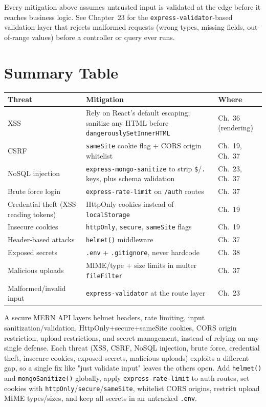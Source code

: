 Every mitigation above assumes untrusted input is validated at the edge
before it reaches business logic. See Chapter~23 for the
\texttt{express-validator}-based validation layer that rejects malformed
requests (wrong types, missing fields, out-of-range values) before a
controller or query ever runs.

\section{Summary Table}

\begin{center}
\begin{tabularx}{\textwidth}{p{2.6cm}Xp{2.6cm}}
\toprule
\textbf{Threat} & \textbf{Mitigation} & \textbf{Where} \\
\midrule
XSS & Rely on React's default escaping; sanitize any HTML before \texttt{dangerouslySetInnerHTML} & Ch.~36 (rendering) \\
CSRF & \texttt{sameSite} cookie flag + CORS origin whitelist & Ch.~19, Ch.~37 \\
NoSQL injection & \texttt{express-mongo-sanitize} to strip \texttt{\$}/\texttt{.} keys, plus schema validation & Ch.~23, Ch.~37 \\
Brute force login & \texttt{express-rate-limit} on \texttt{/auth} routes & Ch.~37 \\
Credential theft (XSS reading tokens) & HttpOnly cookies instead of \texttt{localStorage} & Ch.~19 \\
Insecure cookies & \texttt{httpOnly}, \texttt{secure}, \texttt{sameSite} flags & Ch.~19 \\
Header-based attacks & \texttt{helmet()} middleware & Ch.~37 \\
Exposed secrets & \texttt{.env} + \texttt{.gitignore}, never hardcode & Ch.~38 \\
Malicious uploads & MIME/type + size limits in multer \texttt{fileFilter} & Ch.~37 \\
Malformed/invalid input & \texttt{express-validator} at the route layer & Ch.~23 \\
\bottomrule
\end{tabularx}
\end{center}

\whatwhyhow
{A secure MERN API layers helmet headers, rate limiting, input sanitization/validation, HttpOnly+secure+sameSite cookies, CORS origin restriction, upload restrictions, and secret management, instead of relying on any single defense.}
{Each threat (XSS, CSRF, NoSQL injection, brute force, credential theft, insecure cookies, exposed secrets, malicious uploads) exploits a different gap, so a single fix like "just validate input" leaves the others open.}
{Add \texttt{helmet()} and \texttt{mongoSanitize()} globally, apply \texttt{express-rate-limit} to auth routes, set cookies with \texttt{httpOnly}/\texttt{secure}/\texttt{sameSite}, whitelist CORS origins, restrict upload MIME types/sizes, and keep all secrets in an untracked \texttt{.env}.}
